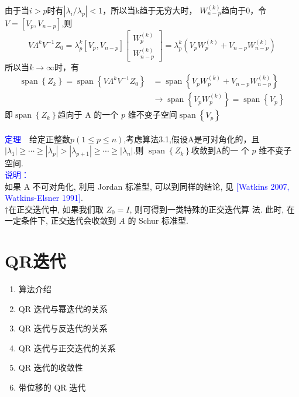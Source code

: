 \documentclass[12pt,a4paper]{article}
\begin{document}
由于当$i>p$时有$\left|\lambda_{i} / \lambda_{p}\right|<1$，所以当k趋于无穷大时，
$W_{n-p}^{(k)}$趋向于0，令$V=\left[V_{p}, V_{n-p}\right]$,则
$$V \Lambda^{k} V^{-1} Z_{0}=\lambda_{p}^{k}\left[V_{p}, V_{n-p}\right]\left[\begin{array}{c}{W_{p}^{(k)}} \\ {W_{n-p}^{(k)}}\end{array}\right]=\lambda_{p}^{k}\left(V_{p} W_{p}^{(k)}+V_{n-p} W_{n-p}^{(k)}\right)$$
所以当$k \rightarrow \infty$时，有
$$
\begin{aligned} \operatorname{span}\left\{Z_{k}\right\}=\operatorname{span}\left\{V \Lambda^{k} V^{-1} Z_{0}\right\} &=\operatorname{span}\left\{V_{p} W_{p}^{(k)}+V_{n-p} W_{n-p}^{(k)}\right\} \\ & \rightarrow \operatorname{span}\left\{V_{p} W_{p}^{(k)}\right\}=\operatorname{span}\left\{V_{p}\right\} \end{aligned}
$$
即$\operatorname{span}\left\{Z_{k}\right\}$趋向于 A 的一个 $p$ 维不变子空间$\operatorname{span}\left\{V_{p}\right\}$\\
\\
\textcolor{blue}{定理}~~给定正整数$p(1 \leq p \leq n)$,考虑算法3.1,假设A是可对角化的，且$\left|\lambda_{1}\right| \geq \cdots \geq\left|\lambda_{p}\right|>\left|\lambda_{p+1}\right| \geq \cdots \geq\left|\lambda_{n}\right|$.则
$\operatorname{span}\left\{Z_{k}\right\}$收敛到A的一 个 $p$ 维不变子空间.\\
\textcolor{blue}{说明：}\\
如果 A 不可对角化, 利用 Jordan 标准型, 可以到同样的结论, 见 \textcolor{blue}{[Watkins 2007, Watkins-Elsner 1991]}.\\
$\dagger$在正交迭代中, 如果我们取 $Z_{0} = I$, 则可得到一类特殊的正交迭代算 法. 此时, 在一定条件下, 正交迭代会收敛到 $A$ 的 Schur 标准型.
\section{QR迭代}
\begin{enumerate}[4.1]
\item 算法介绍
\item  QR 迭代与幂迭代的关系
\item  QR 迭代与反迭代的关系
\item  QR 迭代与正交迭代的关系
\item  QR 迭代的收敛性
\item  带位移的 QR 迭代
\end{enumerate}
\end{document}
